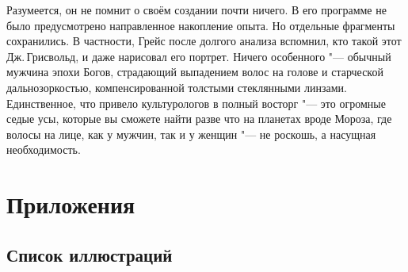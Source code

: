 Разумеется, он не помнит о своём создании почти ничего.
В его программе не было предусмотрено направленное накопление опыта.
Но отдельные фрагменты сохранились.
В частности, Грейс после долгого анализа вспомнил, кто такой этот Дж.\,Грисвольд, и даже нарисовал его портрет.
Ничего особенного "--- обычный мужчина эпохи Богов, страдающий выпадением волос на голове и старческой дальнозоркостью, компенсированной толстыми стеклянными линзами.
Единственное, что привело культурологов в полный восторг "--- это огромные седые усы, которые вы сможете найти разве что на планетах вроде Мороза, где волосы на лице, как у мужчин, так и у женщин "--- не роскошь, а насущная необходимость.

\chapter{Приложения}

\section{Список иллюстраций}

